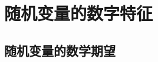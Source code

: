 \documentclass[11pt,twoside,a4paper]{ctexart}
\begin{document}
    \section{随机变量的数字特征}
    \subsection{随机变量的数学期望}
\end{document}

